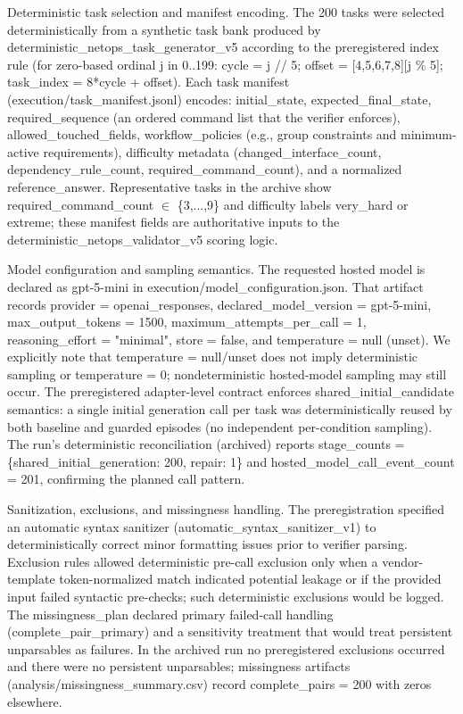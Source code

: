 \documentclass[conference]{IEEEtran}
\begin{document}
Deterministic task selection and manifest encoding. The 200 tasks were selected deterministically from a synthetic task bank produced by deterministic\_netops\_task\_generator\_v5 according to the preregistered index rule (for zero-based ordinal j in 0..199: cycle = j // 5; offset = [4,5,6,7,8][j \% 5]; task\_index = 8*cycle + offset). Each task manifest (execution/task\_manifest.jsonl) encodes: initial\_state, expected\_final\_state, required\_sequence (an ordered command list that the verifier enforces), allowed\_touched\_fields, workflow\_policies (e.g., group constraints and minimum-active requirements), difficulty metadata (changed\_interface\_count, dependency\_rule\_count, required\_command\_count), and a normalized reference\_answer. Representative tasks in the archive show required\_command\_count \ensuremath{\in} \{3,...,9\} and difficulty labels very\_hard or extreme; these manifest fields are authoritative inputs to the deterministic\_netops\_validator\_v5 scoring logic.

Model configuration and sampling semantics. The requested hosted model is declared as gpt-5-mini in execution/model\_configuration.json. That artifact records provider = openai\_responses, declared\_model\_version = gpt-5-mini, max\_output\_tokens = 1500, maximum\_attempts\_per\_call = 1, reasoning\_effort = "minimal", store = false, and temperature = null (unset). We explicitly note that temperature = null/unset does not imply deterministic sampling or temperature = 0; nondeterministic hosted-model sampling may still occur. The preregistered adapter-level contract enforces shared\_initial\_candidate semantics: a single initial generation call per task was deterministically reused by both baseline and guarded episodes (no independent per-condition sampling). The run's deterministic reconciliation (archived) reports stage\_counts = \{shared\_initial\_generation: 200, repair: 1\} and hosted\_model\_call\_event\_count = 201, confirming the planned call pattern.

Sanitization, exclusions, and missingness handling. The preregistration specified an automatic syntax sanitizer (automatic\_syntax\_sanitizer\_v1) to deterministically correct minor formatting issues prior to verifier parsing. Exclusion rules allowed deterministic pre-call exclusion only when a vendor-template token-normalized match indicated potential leakage or if the provided input failed syntactic pre-checks; such deterministic exclusions would be logged. The missingness\_plan declared primary failed-call handling (complete\_pair\_primary) and a sensitivity treatment that would treat persistent unparsables as failures. In the archived run no preregistered exclusions occurred and there were no persistent unparsables; missingness artifacts (analysis/missingness\_summary.csv) record complete\_pairs = 200 with zeros elsewhere.
\end{document}
